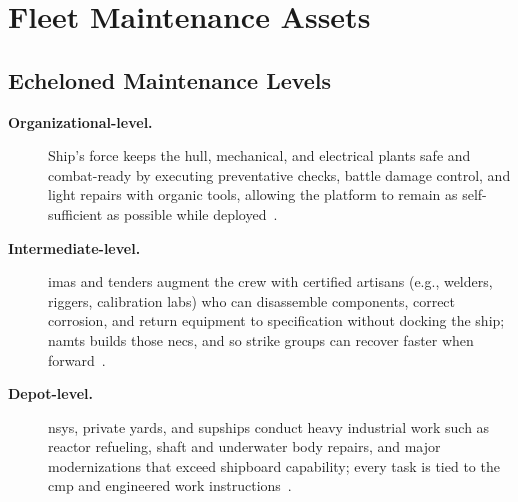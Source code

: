 \documentclass[../main.tex]{subfiles}
\begin{document}
\section{Fleet Maintenance Assets}

\subsection{Echeloned Maintenance Levels}
\begin{description}
  \item[\textbf{Organizational-level.}] Ship's force keeps the hull, mechanical, and electrical plants safe and combat-ready by executing preventative checks, battle damage control, and light repairs with organic tools, allowing the platform to remain as self-sufficient as possible while deployed~\autocite{OPNAVINST4700-7M,edo-4-1-1-fleet-maint-assets-2025}.
  \item[\textbf{Intermediate-level.}] \acp{ima} and tenders augment the crew with certified artisans (e.g., welders, riggers, calibration labs) who can disassemble components, correct corrosion, and return equipment to specification without docking the ship; \ac{namts} builds those \acp{nec}, and so strike groups can recover faster when forward~\autocite{OPNAVINST4700-7M,edo-4-1-1-fleet-maint-assets-2025}.
  \item[\textbf{Depot-level.}] \acp{nsy}, private yards, and \acp{supship} conduct heavy industrial work such as reactor refueling, shaft and underwater body repairs, and major modernizations that exceed shipboard capability; every task is tied to the \ac{cmp} and engineered work instructions~\autocite{NAVSEAINST5450-14D,NAVSEAINST5450-145A,edo-4-1-1-fleet-maint-assets-2025}.
\end{description}
\end{document}
